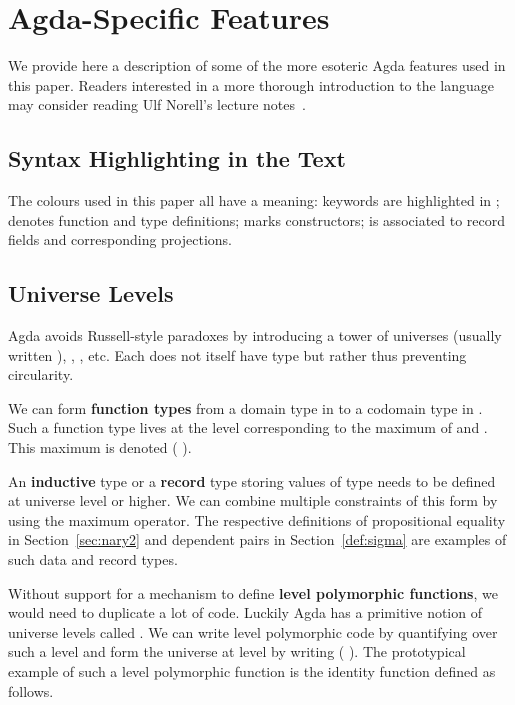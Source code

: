 \section{Agda-Specific Features}\label{appendix:agda}

We provide here a description of some of the more esoteric Agda
features used in this paper. Readers interested in a more thorough
introduction to the language may consider reading Ulf Norell's lecture
notes~\cite{DBLP:conf/afp/Norell08}.

\subsection{Syntax Highlighting in the Text}

The colours used in this paper all have a meaning: keywords are highlighted
in ;  denotes function and type definitions; 
marks constructors;  is associated to record fields and
corresponding projections.

\subsection{Universe Levels}\label{appendix:agda:level}
\balance

Agda avoids Russell-style paradoxes by introducing a tower of universes
 (usually written ), , , etc. Each
 does not itself have type  but rather  thus
preventing circularity.

We can form {\bf function types} from a domain type in  to a codomain
type in . Such a function type lives at the level corresponding
to the maximum of  and . This maximum is denoted {(  )}.

An {\bf inductive} type or a {\bf record} type storing values of type 
needs to be defined at universe level  or higher. We can combine multiple
constraints of this form by using the maximum operator. The respective definitions
of propositional equality in Section~\ref{sec:nary2} and dependent pairs in
Section~\ref{def:sigma} are examples of such data and record types.

Without support for a mechanism to define {\bf level polymorphic functions},
we would need to duplicate a lot of code. Luckily Agda has a primitive notion
of universe levels called . We can write level polymorphic code by
quantifying over such a level  and form the universe at level
 by writing ( ). The prototypical example of such a level
polymorphic function is the identity function  defined as follows.

